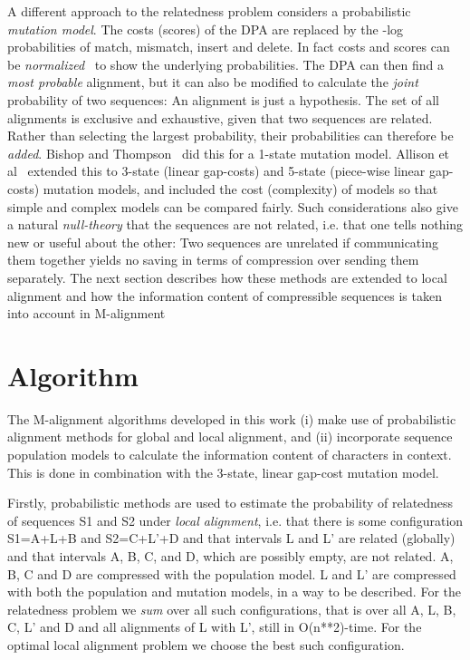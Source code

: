\documentclass[letterpaper,11pt,oneside]{article}
\begin{document}
\begin{multicols}{2}
A different approach to the relatedness problem
considers a probabilistic {\em mutation model}.
The costs (scores) of the DPA are replaced by the -log probabilities
of match, mismatch, insert and delete.
In fact costs and scores can be {\em normalized}~\cite{allison93a} to show
the underlying probabilities.
The DPA can then find a {\em most probable} alignment, but it can also
be modified to calculate the {\em joint} probability of two sequences:
An alignment is just a hypothesis.
The set of all alignments is exclusive and exhaustive, given that
two sequences are related.
Rather than selecting the largest probability,
their probabilities can therefore be {\em added}.
Bishop and Thompson~\cite{bishop86} did this for a 1-state mutation model.
Allison et al~\cite{allison92a} extended this to 3-state (linear gap-costs)
and 5-state (piece-wise linear gap-costs) mutation models,
and included the cost (complexity) of models so that simple
and complex models can be compared fairly.
Such considerations also give
a natural {\em null-theory} that the sequences are not related,
i.e. that one tells nothing new or useful about the other:
Two sequences are unrelated if
communicating them together yields no saving in terms
of compression over sending them separately.
The next section describes how these methods
are extended to local alignment and how the information
content of compressible sequences is taken into account in M-alignment


\section{Algorithm} \label{sec:alg}

The M-alignment algorithms developed in this work
(i) make use of probabilistic alignment methods
for global and local alignment, and
(ii) incorporate sequence population models to calculate
the information content of characters in context.
This is done in combination with the 3-state, linear gap-cost mutation model.

Firstly,
probabilistic methods are used to estimate the probability of relatedness
of sequences S1 and S2 under {\em local alignment}, i.e. that there is some
configuration S1=A+L+B and S2=C+L'+D and that intervals L and L' are
related (globally) and that intervals A, B, C, and D, which are possibly empty,
are not related.
A, B, C and D are compressed with the population model.
L and L' are compressed with both the population and mutation models,
in a way to be described.
For the relatedness problem we {\em sum} over all such configurations,
that is over all A, L, B, C, L' and D and all alignments of L with L',
still in O(n**2)-time.
For the optimal local alignment problem we choose the best such configuration.


\end{multicols}
\end{document}
